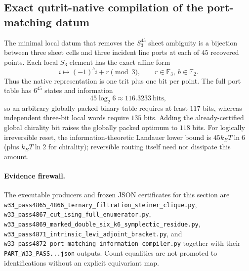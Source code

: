 \subsection{Exact qutrit-native compilation of the port-matching datum}

The minimal local datum that removes the $S_3^{45}$ sheet ambiguity is a
bijection between three sheet cells and three incident line ports at each of
$45$ recovered points.  Each local $S_3$ element has the exact affine form
\[
  i\longmapsto(-1)^b i+r\pmod3,
  \qquad r\in\mathbb F_3,\ b\in\mathbb F_2.
\]
Thus the native representation is one trit plus one bit per point.  The full
port table has $6^{45}$ states and information
\[
  45\log_2 6\approx116.3233\ \text{bits},
\]
so an arbitrary globally packed binary table requires at least $117$ bits,
whereas independent three-bit local words require $135$ bits.  Adding the
already-certified global chirality bit raises the globally packed optimum to
$118$ bits.  For logically irreversible reset, the information-theoretic
Landauer lower bound is $45k_BT\ln6$ (plus $k_BT\ln2$ for chirality); reversible
routing itself need not dissipate this amount.

\paragraph{Evidence firewall.}
The executable producers and frozen JSON certificates for this section are
\texttt{w33\_pass4865\_4866\_ternary\_filtration\_steiner\_clique.py},
\texttt{w33\_pass4867\_cut\_ising\_full\_enumerator.py},
\texttt{w33\_pass4869\_marked\_double\_six\_k6\_symplectic\_residue.py},
\texttt{w33\_pass4871\_intrinsic\_levi\_adjoint\_bracket.py}, and
\texttt{w33\_pass4872\_port\_matching\_information\_compiler.py} together
with their \texttt{PART\_W33\_PASS...json} outputs.  Count equalities are not
promoted to identifications without an explicit equivariant map.

